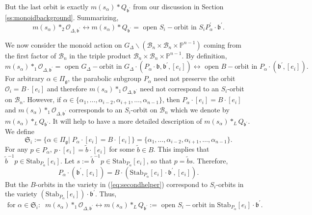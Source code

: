 \documentclass[12pt]{amsart}
\numberwithin{equation}{section}
\theoremstyle{remark}
\theoremstyle{definition}
\newcommand{\fg}{\mbox{${\mathfrak g}$}}
\newcommand{\fb}{\mbox{${\mathfrak b}$}}
\newcommand{\B}{\mathcal{B}}
\newcommand{\ms}{m(s_{\alpha})}
\newcommand{\calO}{\mathcal{O}}
\begin{document}
But the last orbit is exactly $\ms*Q_{\fb^{\prime}}$ from our discussion in Section \ref{ss:monoidbackground}.  
Summarizing, 
\begin{equation}\label{eq:secondfactormonoid}
\ms*_{2} \mathcal{O}_{\Delta,\fb^{\prime}}\longleftrightarrow \ms* Q_{\fb^{\prime}}=  \mbox{ open } S_{i}-\mbox{orbit in } S_{i}P_{\alpha}^{\prime}\cdot\fb^{\prime}.
\end{equation}

We now consider the monoid action on $G_{\Delta}\backslash(\B_{n}\times\B_{n}\times\mathbb{P}^{n-1})$ coming from the first factor of $\B_{n}$ in the triple product 
$\B_{n}\times\B_{n}\times\mathbb{P}^{n-1}$.  By definition,
\begin{equation}\label{eq:firstfactorfirst}
\ms*_{1} \mathcal{O}_{\Delta,\fb^{\prime}}=\mbox{ open } G_{\Delta}-\mbox{orbit in } G_{\Delta}\cdot (P_{\alpha}\cdot\fb, \fb^{\prime}, [e_{i}])\longleftrightarrow \mbox{ open } B-\mbox{orbit in } P_{\alpha}\cdot (\fb^{\prime}, [e_{i}]).
\end{equation}
For arbitrary $\alpha\in \Pi_{\fg}$, the parabolic subgroup $P_{\alpha}$ need not preserve the orbit $\mathcal{O}_{i}=B\cdot[e_{i}]$ and therefore $\ms*_{1}\mathcal{O}_{\Delta, \fb^{\prime}}$ need not correspond to an $S_{i}$-orbit on $\B_{n}$.  However, if $\alpha\in \{\alpha_{1},\dots, \alpha_{i-2},\alpha_{i+1},\dots, \alpha_{n-1}\}$, then $P_{\alpha}\cdot[e_{i}]=B\cdot[e_{i}]$ and $\ms*_{1} \calO_{\Delta,\fb^{\prime}}$ corresponds to an $S_{i}$-orbit on $\B_{n}$ which we denote by $\ms*_{L} Q_{\fb^{\prime}}$.  It will help to have a more detailed description of $\ms*_{L} Q_{\fb^{\prime}}$.
We define
\begin{equation}\label{eq:extraroots}
\mathfrak{S}_i:=\{\alpha\in\Pi_{\fg}|\; P_{\alpha}\cdot[e_{i}]=B\cdot[e_{i}]\}=\{\alpha_{1},\dots, \alpha_{i-2},\alpha_{i+1},\dots, \alpha_{n-1}\}.
\end{equation}
For any $p\in P_{\alpha}$, $p\cdot[e_{i}]=\tilde{b}\cdot[e_{i}]$ for some $\tilde{b}\in B$.  This implies that $\tilde{b}^{-1} p\in\mbox{Stab}_{P_{\alpha}}[e_{i}]$.  Let $s:=\tilde{b}^{-1} p\in\mbox{Stab}_{P_{\alpha}}[e_{i}]$, so that 
$p=\tilde{b}s$.  Therefore,
\begin{equation}\label{eq:secondhelper}
P_{\alpha}\cdot (\fb^{\prime}, [e_{i}])=B\cdot ( \mbox{Stab}_{P_{\alpha}}[e_{i}]\cdot\fb^{\prime}, [e_{i}]). 
\end{equation}
But the $B$-orbits in the variety in (\ref{eq:secondhelper}) correspond to $S_{i}$-orbits in the variety $(\mbox{Stab}_{P_{\alpha}}[e_{i}])\cdot\fb^{\prime}$.  Thus,  
\begin{equation}\label{eq:leftmonoidSi}
\mbox{ for } \alpha\in\mathfrak{S}_i:\; \;\ms*_{1} \mathcal{O}_{\Delta,\fb^{\prime}}\longleftrightarrow \ms*_{L}Q_{\fb^{\prime}}:=\mbox{ open } S_{i}-\mbox{orbit in } \mbox{Stab}_{P_{\alpha}}[e_{i}] \cdot\fb^{\prime}.
\end{equation}
\end{document}

